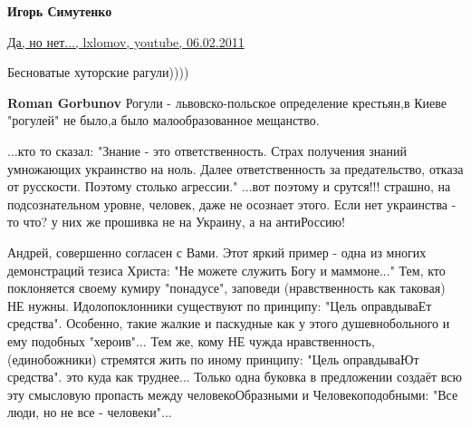 \begin{itemize}
\begin{itemize}
 
\textbf{Игорь Симутенко} 

\href{https://youtu.be/PqC5amepVB0}{%
Да, но нет..., lxlomov, youtube, 06.02.2011%
}
\end{itemize}

 
Бесноватые хуторские рагули))))

\begin{itemize}
 
\textbf{Roman Gorbunov} Рогули - львовско-польское определение крестьян,в Киеве "рогулей" не было,а было малообразованное мещанство.
\end{itemize}

 

...кто то сказал: "Знание - это ответственность. Страх получения знаний
умножающих украинство на ноль. Далее ответственность за предательство, отказа
от русскости. Поэтому столько агрессии." ...вот поэтому и срутся!!! страшно, на
подсознательном уровне, человек, даже не осознает этого. Если нет украинства -
то что? у них же прошивка не на Украину, а на антиРоссию!


 

\obeycr
Андрей, совершенно согласен с Вами.
Этот яркий пример - одна из многих демонстраций тезиса Христа: "Не можете служить Богу и маммоне..."
Тем, кто поклоняется своему кумиру "понадусе", заповеди (нравственность как таковая) НЕ нужны.
Идолопоклонники существуют по принципу: "Цель оправдываЕт средства". Особенно, такие жалкие и паскудные как у этого душевнобольного и ему подобных "хероив"...
Тем же, кому НЕ чужда нравственность, (единобожники) стремятся жить по иному принципу: "Цель оправдываЮт средства". это куда как труднее...
Только одна буковка в предложении создаёт всю эту смысловую пропасть между человекоОбразными и Человекоподобными: "Все люди, но не все - человеки"...
\restorecr


\end{itemize}
